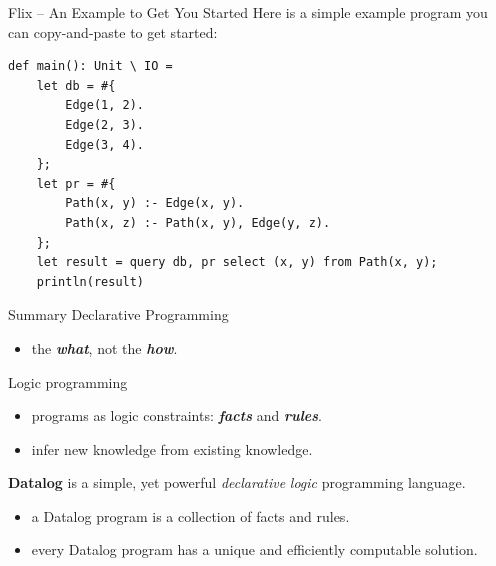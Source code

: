 \begin{frame}[fragile]{Flix -- An Example to Get You Started}
Here is a simple example program you can copy-and-paste to get started:
\begin{lstlisting}[language=flix]
def main(): Unit \ IO = 
    let db = #{
        Edge(1, 2).
        Edge(2, 3).
        Edge(3, 4).
    };
    let pr = #{
        Path(x, y) :- Edge(x, y).
        Path(x, z) :- Path(x, y), Edge(y, z).
    };
    let result = query db, pr select (x, y) from Path(x, y);
    println(result)
\end{lstlisting}
\end{frame}

\begin{frame}{Summary}
Declarative Programming
\begin{itemize}
    \item the \textbf{\emph{what}}, not the \textbf{\emph{how}}.
\end{itemize}

\pause

Logic programming
\begin{itemize}
    \item programs as logic constraints: \textbf{\emph{facts}} and \textbf{\emph{rules}}.
    \item infer new knowledge from existing knowledge.
\end{itemize}

\pause

\textbf{Datalog} is a simple, yet powerful \emph{declarative} \emph{logic}
programming language.
\begin{itemize}
    \item a Datalog program is a collection of facts and rules. 
    \item every Datalog program has a unique and efficiently computable solution.
\end{itemize}
\end{frame}

\begin{frame}[standout]
\end{frame}

